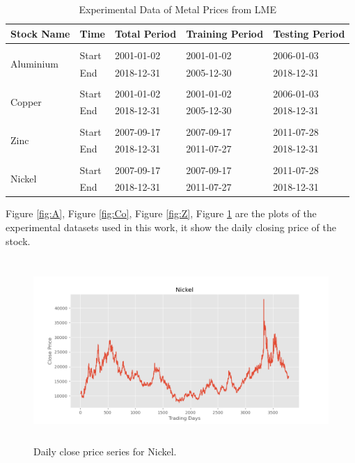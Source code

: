 \documentclass{ws-ijait}
\begin{document}
\begin{table}[!htbp]
	\begin{center}
		\begin{tabular}{ p{1.5cm}p{1cm}p{2cm}p{2cm}p{2cm}  } \hline
			
			Stock Name &Time &Total Period &Training Period &Testing Period\\ \hline \hline \\
			\multirow{2}{*}{Aluminium}&Start & 2001-01-02  &2001-01-02  &2006-01-03 \\
			&End & 2018-12-31 &2005-12-30 &2018-12-31\\ \hline\\
			\multirow{2}{*}{Copper}&Start & 2001-01-02  &2001-01-02  &2006-01-03 \\
			&End & 2018-12-31 &2005-12-30 &2018-12-31\\  \hline\\
			\multirow{2}{*}{Zinc}&Start & 2007-09-17  &2007-09-17  &2011-07-28 \\
			&End & 2018-12-31 &2011-07-27 &2018-12-31\\ \hline\\
			\multirow{2}{*}{Nickel}&Start & 2007-09-17  &2007-09-17  &2011-07-28 \\
			&End & 2018-12-31 &2011-07-27 &2018-12-31\\ \hline \hline
		\end{tabular}
		\caption{Experimental Data of Metal Prices from LME} \label{tab1}
	\end{center}
\end{table}
Figure \ref{fig:A}, Figure \ref{fig:Co}, Figure \ref{fig:Z}, Figure \ref{fig:N} are the plots of the experimental datasets used in this work, it show the daily closing price of the stock.
\begin{center}
	\begin{figure}[!htbp]
		\centering
		\includegraphics[width=15cm, height=7cm]{N.png}
		\caption{Daily close price series for Nickel.}
		\label{fig:N}
	\end{figure}
\end{center}
\end{document}
